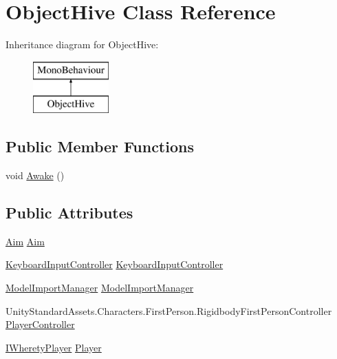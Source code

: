 \hypertarget{class_object_hive}{}\section{Object\+Hive Class Reference}
\label{class_object_hive}
Inheritance diagram for Object\+Hive\+:\begin{figure}[H]
\begin{center}
\leavevmode
\includegraphics[height=2.000000cm]{class_object_hive}
\end{center}
\end{figure}
\subsection*{Public Member Functions}
\begin{DoxyCompactItemize}
\item 
void \mbox{\hyperlink{class_object_hive_a003de014f458041bc4ed74e3a716d77b}{Awake}} ()
\end{DoxyCompactItemize}
\subsection*{Public Attributes}
\begin{DoxyCompactItemize}
\item 
\mbox{\hyperlink{class_aim}{Aim}} \mbox{\hyperlink{class_object_hive_af3fb446a374ca13950daefb4d408d621}{Aim}}
\item 
\mbox{\hyperlink{class_keyboard_input_controller}{Keyboard\+Input\+Controller}} \mbox{\hyperlink{class_object_hive_a8be6d8bd13ee8bd522b428a8c78c9f00}{Keyboard\+Input\+Controller}}
\item 
\mbox{\hyperlink{class_model_import_manager}{Model\+Import\+Manager}} \mbox{\hyperlink{class_object_hive_afbf790c375bc8228b66428070789247d}{Model\+Import\+Manager}}
\item 
Unity\+Standard\+Assets.\+Characters.\+First\+Person.\+Rigidbody\+First\+Person\+Controller \mbox{\hyperlink{class_object_hive_a10f297a8c8d875b9250799d2a86db441}{Player\+Controller}}
\item 
\mbox{\hyperlink{interface_i_wherety_player}{I\+Wherety\+Player}} \mbox{\hyperlink{class_object_hive_a933d07cee34249f0111144125b45b54c}{Player}}
\end{DoxyCompactItemize}
